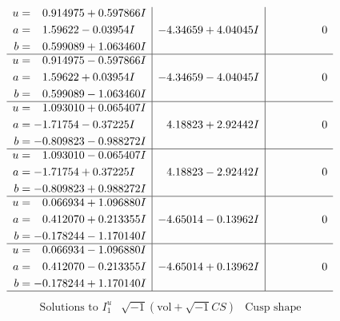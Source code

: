 \documentclass[1p]{elsarticle_modified}
\theoremstyle{definition}
\newcommand{\I}{\sqrt{-1}}
\begin{document}
$$\begin{array}{c|c|c}
\begin{aligned}
u &= \phantom{-}0.914975 + 0.597866 I \\
a &= \phantom{-}1.59622 - 0.03954 I \\
b &= \phantom{-}0.599089 + 1.063460 I\end{aligned}
 & -4.34659 + 4.04045 I & \phantom{-0.000000 } 0 \\ \hline\begin{aligned}
u &= \phantom{-}0.914975 - 0.597866 I \\
a &= \phantom{-}1.59622 + 0.03954 I \\
b &= \phantom{-}0.599089 - 1.063460 I\end{aligned}
 & -4.34659 - 4.04045 I & \phantom{-0.000000 } 0 \\ \hline\begin{aligned}
u &= \phantom{-}1.093010 + 0.065407 I \\
a &= -1.71754 - 0.37225 I \\
b &= -0.809823 - 0.988272 I\end{aligned}
 & \phantom{-}4.18823 + 2.92442 I & \phantom{-0.000000 } 0 \\ \hline\begin{aligned}
u &= \phantom{-}1.093010 - 0.065407 I \\
a &= -1.71754 + 0.37225 I \\
b &= -0.809823 + 0.988272 I\end{aligned}
 & \phantom{-}4.18823 - 2.92442 I & \phantom{-0.000000 } 0 \\ \hline\begin{aligned}
u &= \phantom{-}0.066934 + 1.096880 I \\
a &= \phantom{-}0.412070 + 0.213355 I \\
b &= -0.178244 - 1.170140 I\end{aligned}
 & -4.65014 - 0.13962 I & \phantom{-0.000000 } 0 \\ \hline\begin{aligned}
u &= \phantom{-}0.066934 - 1.096880 I \\
a &= \phantom{-}0.412070 - 0.213355 I \\
b &= -0.178244 + 1.170140 I\end{aligned}
 & -4.65014 + 0.13962 I & \phantom{-0.000000 } 0\\
 \hline 
 \end{array}$$\newpage$$\begin{array}{c|c|c}  
\text{Solutions to }I^u_{1}& \I (\text{vol} + \sqrt{-1}CS) & \text{Cusp shape}\\
 \hline 
\begin{aligned}

\end{aligned}
\end{array}$$
\end{document}
